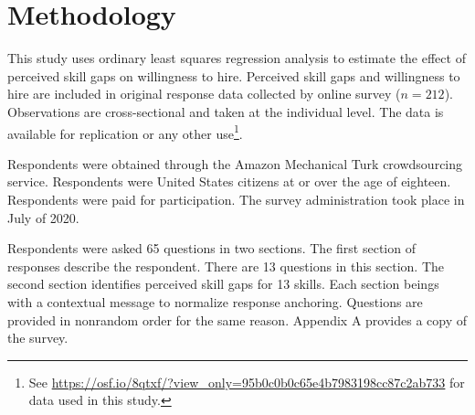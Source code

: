 \documentclass[review]{elsarticle}
\begin{document}

\section{Methodology}


This study uses ordinary least squares regression analysis to estimate the effect of perceived skill gaps on willingness to hire.
Perceived skill gaps and willingness to hire are included in original response data collected by online survey ($n = 212$).
Observations are cross-sectional and taken at the individual level.
The data is available for replication or any other use\footnote{
    See \url{https://osf.io/8qtxf/?view_only=95b0c0b0c65e4b7983198cc87c2ab733}
    for data used in this study.
}.

Respondents were obtained through the Amazon Mechanical Turk crowdsourcing service.
Respondents were United States citizens at or over the age of eighteen.
Respondents were paid for participation.
The survey administration took place in July of 2020.

Respondents were asked 65 questions in two sections.
The first section of responses describe the respondent.
There are 13 questions in this section.
The second section identifies perceived skill gaps for 13 skills.
Each section beings with a contextual message to normalize response anchoring.
Questions are provided in nonrandom order for the same reason.
Appendix A provides a copy of the survey.
\end{document}
